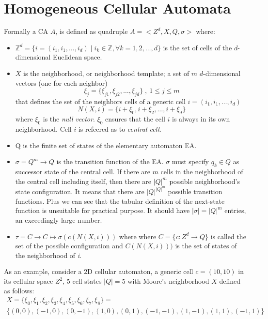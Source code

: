 \section{Homogeneous Cellular Automata}\label{homogeneousCellularAutomata}
Formally a CA $A$, is defined as  quadruple $ A=<Z^d,X,Q,\sigma>$
where:
\begin{itemize}
  \item $\mathbb{Z}^d=\{i=(i_1,i_1,\ldots,i_d)\mid i_k \in
  \mathbb{Z}, \forall k=1,2,\ldots,d \}$ is the set of cells of the $d$-dimensional  Euclidean space.
  \item $X$ is the neighborhood, or neighborhood template; a
  set of $m$ $d$-dimensional vectors (one for each neighbor)
  \[\xi_j=\{\xi_{j1},\xi_{j2},\ldots,\xi_{jd}\} \;,\: 1\leq j \leq m\] that
  defines the set of the neighbors cells of a generic cell
  $i=(i_1,i_1,\ldots,i_d)$
  \[
  N(X,i)=\{i+\xi_0,i+\xi_2,\ldots,i+\xi_d\}
  \] where $\xi_0$ is the \textit{null vector}. $\xi_0$ ensures that the
  cell $i$ is always in its own neighborhood.  Cell $i$ is refeered as to \emph{central cell}.

\item Q is the finite set of states of the elementary automaton EA.
  
  \item $\sigma=Q^m \rightarrow Q $ is the transition
  function of the EA. $\sigma$ must specify
  $q_k \in Q $ as successor  state of the central cell.
  If there are $m$ cells in the neighborhood of the central
  cell including itself, then there are
  ${\left\vert{Q}\right\vert}^m$ possible neighborhood's
  state configuration. It  means that there are
  ${\left\vert{Q}\right\vert}^{{\left\vert{Q}\right\vert}^m}$
  possible transition functions. Plus we can see that the tabular definition of
  the next-state function is unsuitable for practical purpose. It should have
  $\left\vert{\sigma}\right\vert={\left\vert{Q}\right\vert}^m$
  entries, an exceedingly large number.
  \item $\tau=C \longrightarrow C \longmapsto
  \sigma(c(N(X,i))) $ where 
  where $C=\{c \colon Z^d
  \rightarrow Q\}$
  is called the set of the possible configuration and 
  $
  C(N(X,i)))$ is the set of states of the neighborhood of \textit{i}.
\end{itemize}
As an example, consider a $2$D cellular automaton, a
generic cell $c=(10,10)$ in its cellular space $Z^2$, 5 cell states  ${\left\vert{Q}\right\vert}=5$ with Moore's neighborhood  $X$ defined as follows:
\begin{gather*}
X=\{\xi_{0},\xi_{1},\xi_{2},\xi_{3},\xi_{4},\xi_{5},\xi_{6},\xi_{7},\xi_{8}\}
=\\ \{(0,0),(-1,0),(0,-1),(1,0),(0,1),(-1,-1),(1,-1),(1,1),(-1,1)\}
\end{gather*}
